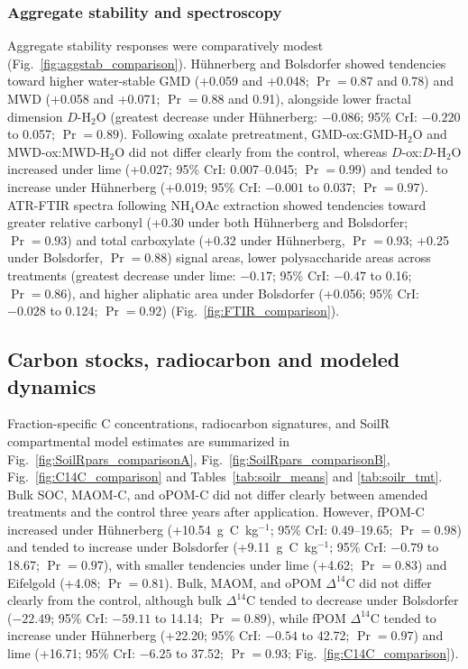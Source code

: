 \documentclass[preprint,12pt]{elsarticle}
\begin{document}
\subsubsection{Aggregate stability and spectroscopy}
Aggregate stability responses were comparatively modest (Fig.~\ref{fig:aggstab_comparison}). H\"uhnerberg and Bolsdorfer showed tendencies toward higher water-stable GMD (+0.059 and +0.048; $\Pr = 0.87$ and 0.78) and MWD (+0.058 and +0.071; $\Pr = 0.88$ and 0.91), alongside lower fractal dimension $D$-H$_2$O (greatest decrease under H\"uhnerberg: $-0.086$; 95\% CrI: $-0.220$ to 0.057; $\Pr = 0.89$). Following oxalate pretreatment, GMD-ox:GMD-H$_2$O and MWD-ox:MWD-H$_2$O did not differ clearly from the control, whereas $D$-ox:$D$-H$_2$O increased under lime (+0.027; 95\% CrI: 0.007--0.045; $\Pr = 0.99$) and tended to increase under H\"uhnerberg (+0.019; 95\% CrI: $-0.001$ to 0.037; $\Pr = 0.97$). ATR-FTIR spectra following NH$_4$OAc extraction showed tendencies toward greater relative carbonyl (+0.30 under both H\"uhnerberg and Bolsdorfer; $\Pr = 0.93$) and total carboxylate (+0.32 under H\"uhnerberg, $\Pr = 0.93$; +0.25 under Bolsdorfer, $\Pr = 0.88$) signal areas, lower polysaccharide areas across treatments (greatest decrease under lime: $-0.17$; 95\% CrI: $-0.47$ to 0.16; $\Pr = 0.86$), and higher aliphatic area under Bolsdorfer (+0.056; 95\% CrI: $-0.028$ to 0.124; $\Pr = 0.92$) (Fig.~\ref{fig:FTIR_comparison}).

\subsection{Carbon stocks, radiocarbon and modeled dynamics}
\label{subsec:carbon_fractions}

Fraction-specific C concentrations, radiocarbon signatures, and SoilR compartmental model estimates are summarized in Fig.~\ref{fig:SoilRpars_comparisonA}, Fig.~\ref{fig:SoilRpars_comparisonB}, Fig.~\ref{fig:C14C_comparison} and Tables~\ref{tab:soilr_means} and \ref{tab:soilr_tmt}. Bulk SOC, MAOM-C, and oPOM-C did not differ clearly between amended treatments and the control three years after application. However, fPOM-C increased under H\"uhnerberg (+10.54~g~C~kg$^{-1}$; 95\% CrI: 0.49--19.65; $\Pr = 0.98$) and tended to increase under Bolsdorfer (+9.11~g~C~kg$^{-1}$; 95\% CrI: $-0.79$ to 18.67; $\Pr = 0.97$), with smaller tendencies under lime (+4.62; $\Pr = 0.83$) and Eifelgold (+4.08; $\Pr = 0.81$). Bulk, MAOM, and oPOM $\Delta^{14}$C did not differ clearly from the control, although bulk $\Delta^{14}$C tended to decrease under Bolsdorfer ($-22.49$\textperthousand{}; 95\% CrI: $-59.11$ to 14.14; $\Pr = 0.89$), while fPOM $\Delta^{14}$C tended to increase under H\"uhnerberg (+22.20\textperthousand{}; 95\% CrI: $-0.54$ to 42.72; $\Pr = 0.97$) and lime (+16.71\textperthousand{}; 95\% CrI: $-6.25$ to 37.52; $\Pr = 0.93$; Fig.~\ref{fig:C14C_comparison}).
\end{document}

